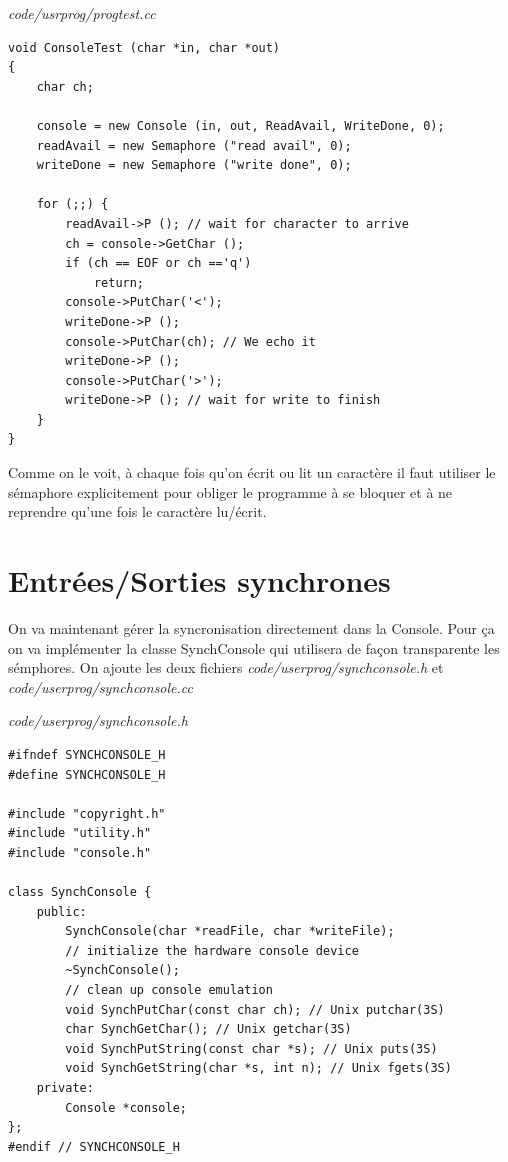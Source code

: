 \documentclass[a4paper,10pt]{article}
\begin{document}
\textit{code/usrprog/progtest.cc}
\begin{lstlisting}
void ConsoleTest (char *in, char *out)
{
    char ch;

    console = new Console (in, out, ReadAvail, WriteDone, 0);
    readAvail = new Semaphore ("read avail", 0);
    writeDone = new Semaphore ("write done", 0);

    for (;;) {
        readAvail->P (); // wait for character to arrive
        ch = console->GetChar ();
        if (ch == EOF or ch =='q')
            return;
        console->PutChar('<');
        writeDone->P ();
        console->PutChar(ch); // We echo it
        writeDone->P ();
        console->PutChar('>');
        writeDone->P (); // wait for write to finish
    }
}
\end{lstlisting}

Comme on le voit, à chaque fois qu'on écrit ou lit un caractère il faut
utiliser le sémaphore explicitement pour obliger le programme à se bloquer et à
ne
reprendre qu'une fois le caractère lu/écrit.

\section{Entrées/Sorties synchrones}
On va maintenant gérer la syncronisation directement dans la Console. Pour ça
on va implémenter la classe SynchConsole qui utilisera de façon
transparente les sémphores. On ajoute les deux fichiers
\textit{code/userprog/synchconsole.h} et \textit{code/userprog/synchconsole.cc}

\textit{code/userprog/synchconsole.h}
\begin{lstlisting}
#ifndef SYNCHCONSOLE_H
#define SYNCHCONSOLE_H

#include "copyright.h"
#include "utility.h"
#include "console.h"

class SynchConsole {
    public:
        SynchConsole(char *readFile, char *writeFile);
        // initialize the hardware console device
        ~SynchConsole();
        // clean up console emulation
        void SynchPutChar(const char ch); // Unix putchar(3S)
        char SynchGetChar(); // Unix getchar(3S)
        void SynchPutString(const char *s); // Unix puts(3S)
        void SynchGetString(char *s, int n); // Unix fgets(3S)
    private:
        Console *console;
};
#endif // SYNCHCONSOLE_H
\end{lstlisting}
\end{document}
